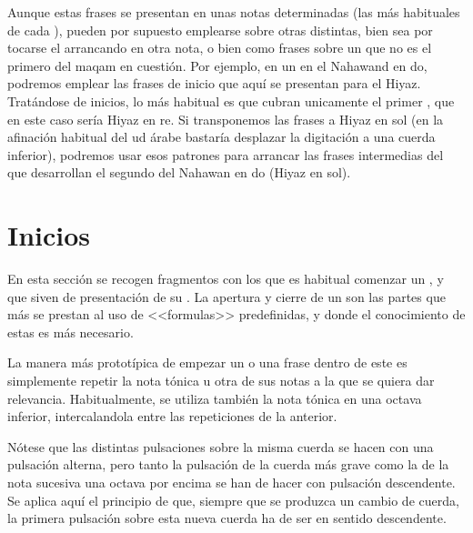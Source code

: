 Aunque estas frases se presentan en unas notas determinadas (las más habituales de cada \maqamb), pueden por supuesto emplearse sobre otras distintas, bien sea por tocarse el \maqam arrancando en otra nota, o bien como frases sobre un \yins que no es el primero del maqam en cuestión. Por ejemplo, en un \taqsim en el \maqam Nahawand en do, podremos emplear las frases de inicio que aquí se presentan para el \maqam Hiyaz. Tratándose de inicios, lo más habitual es que cubran unicamente el primer \yinsb, que en este caso sería Hiyaz en re. Si transponemos las frases a Hiyaz en sol (en la afinación habitual del ud árabe bastaría desplazar la digitación a una cuerda inferior), podremos usar esos patrones para arrancar las frases intermedias del \taqsim que desarrollan el segundo \yins del \maqam Nahawan en do (\yins Hiyaz en sol).

\section{Inicios}

En esta sección se recogen fragmentos con los que es habitual comenzar un \taqsimb, y que siven de presentación de su \maqamb. La apertura y cierre de un \taqsim son las partes que más se prestan al uso de <<formulas>> predefinidas, y donde el conocimiento de estas es más necesario.

La manera más prototípica de empezar un \taqsim o una frase dentro de este es simplemente repetir la nota tónica u otra de sus notas a la que se quiera dar relevancia. Habitualmente, se utiliza también la nota tónica en una octava inferior, intercalandola entre las repeticiones de la anterior.


\begin{center}
\end{center}



Nótese que las distintas pulsaciones sobre la misma cuerda se hacen con una pulsación alterna, pero tanto la pulsación de la cuerda más grave como la de la nota sucesiva una octava por encima se han de hacer con pulsación descendente. Se aplica aquí el principio de que, siempre que se produzca un cambio de cuerda, la primera pulsación sobre esta nueva cuerda ha de ser en sentido descendente.

